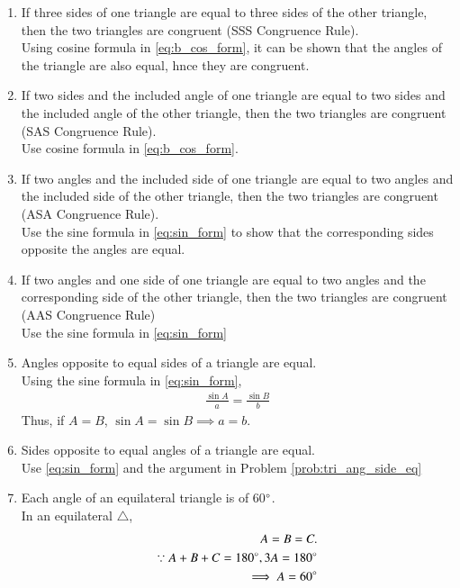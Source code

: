 \renewcommand{\theequation}{\theenumi}
\begin{enumerate}[label=\arabic*.,ref=\thesubsection.\theenumi]
\item If three  sides of one triangle are equal to three sides  of the other triangle, then the two triangles are congruent (SSS Congruence Rule).
%
\\
\solution Using cosine formula in \eqref{eq:b_cos_form}, it can be shown that the angles of the triangle are also equal, hnce they are congruent.
 	
\item If two sides and the included angle of one triangle are equal to two sides and the included angle of the other triangle, then the two triangles are congruent (SAS Congruence Rule).
\\
\solution Use cosine formula in \eqref{eq:b_cos_form}.
\item  If two angles and the included side of one triangle are equal to two angles and the included side of the other triangle, then the two triangles are congruent (ASA Congruence Rule).
%
\\
\solution  Use the sine formula in \eqref{eq:sin_form} to show that the corresponding sides opposite the angles are equal. 
\item If two angles and one side of one triangle are equal to two angles and the corresponding side of the other triangle, then the two triangles are congruent (AAS Congruence Rule)
\\
\solution Use the sine formula in \eqref{eq:sin_form}
\item Angles opposite to equal sides of a triangle are equal. 
\label{prob:tri_ang_side_eq}
\\
\solution Using the sine formula in \eqref{eq:sin_form},%
\begin{align}
\frac{\sin A}{a} = \frac{\sin B}{b}
\end{align}
%
Thus, if $A=B$, $\sin A = \sin B \implies a =b$.
\item  Sides opposite to equal angles of a triangle are equal. 
\\
\solution Use \eqref{eq:sin_form} and the argument in Problem \ref{prob:tri_ang_side_eq}
%
\item  Each angle of an equilateral triangle is of 60$\degree$. 
\\
\solution In an equilateral $\triangle$, 
%
\begin{align}
A=B=C.&
\\
\because A+B+C = 180\degree, 3A = 180\degree&
\\
\implies A = 60\degree&
\end{align}
%


\end{enumerate}
